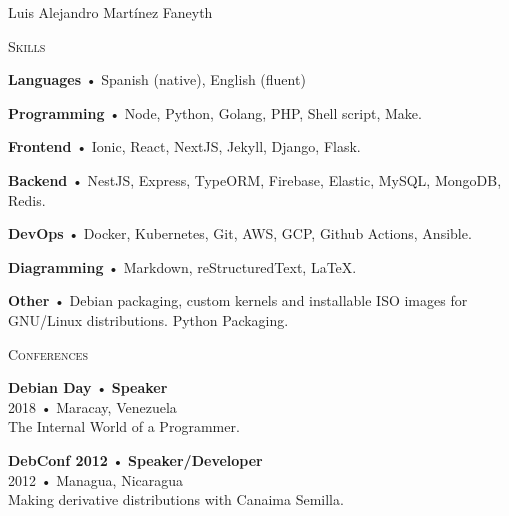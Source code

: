 \documentclass[12pt]{article}
\begin{document}
\begin{cv}{Luis Alejandro Mart\'inez Faneyth}
\begin{minipage}[t]{0.35\textwidth}
    \vspace{0.25em}
    \begin{minipage}{\linewidth}
      \textrm{\textsc{\Large{Skills}}}
      \newline
      \parbox[t]{\linewidth}{
        \textbf{Languages} • \footnotesize{Spanish (native), English (fluent)}
      }
      \parbox[t]{\linewidth}{
        \textbf{Programming} • \footnotesize{Node, Python, Golang, PHP, Shell script, Make.}
      }
      \parbox[t]{\linewidth}{
        \textbf{Frontend} • \footnotesize{Ionic, React, NextJS, Jekyll, Django, Flask.}
      }
      \parbox[t]{\linewidth}{
        \textbf{Backend} • \footnotesize{NestJS, Express, TypeORM, Firebase, Elastic, MySQL, MongoDB, Redis.}
      }
      \parbox[t]{\linewidth}{
        \textbf{DevOps} • \footnotesize{Docker, Kubernetes, Git, AWS, GCP, Github Actions, Ansible.}
      }
      \parbox[t]{\linewidth}{
        \textbf{Diagramming} • \footnotesize{Markdown, reStructuredText, \LaTeX.}
      }
      \parbox[t]{\linewidth}{
        \textbf{Other} • \footnotesize{Debian packaging, custom kernels and installable ISO images for GNU/Linux distributions. Python Packaging.}
      }
      \newline
      \newline
    \end{minipage}

    \vspace{0.25em}
    \begin{minipage}{\linewidth}
      \textrm{\textsc{\Large{Conferences}}}
      \newline
      \parbox[t]{\linewidth}{
        \textbf{Debian Day} • \textrm{\textbf{Speaker}}\\
        2018 • Maracay, Venezuela\\
        \footnotesize{The Internal World of a Programmer.}\\
      }
      \newline
      \parbox[t]{\linewidth}{
        \textbf{DebConf 2012} • \textrm{\textbf{Speaker/Developer}}\\
        2012 • Managua, Nicaragua\\
        \footnotesize{Making derivative distributions with Canaima Semilla.}\\
      }
      \newline
    \end{minipage}


\end{minipage}
\end{cv}
\end{document}
